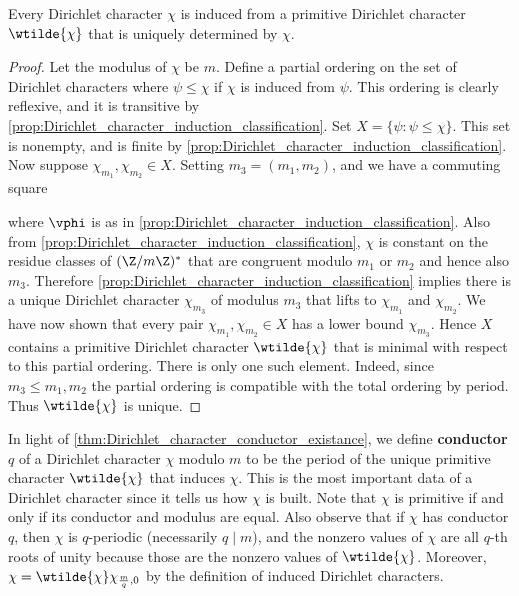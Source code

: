       \begin{theorem}\label{thm:Dirichlet_character_conductor_existance}
        Every Dirichlet character $\chi$ is induced from a primitive Dirichlet character $\wtilde{\chi}$ that is uniquely determined by $\chi$.
      \end{theorem}
      \begin{proof}
        Let the modulus of $\chi$ be $m$. Define a partial ordering on the set of Dirichlet characters where $\psi \le \chi$ if $\chi$ is induced from $\psi$. This ordering is clearly reflexive, and it is transitive by \cref{prop:Dirichlet_character_induction_classification}. Set $X = \{\psi:\psi \le \chi\}$. This set is nonempty, and is finite by \cref{prop:Dirichlet_character_induction_classification}. Now suppose $\chi_{m_{1}},\chi_{m_{2}} \in X$. Setting $m_{3} = (m_{1},m_{2})$, and we have a commuting square
        \begin{center}
        \end{center}
        where $\vphi$ is as in \cref{prop:Dirichlet_character_induction_classification}. Also from \cref{prop:Dirichlet_character_induction_classification}, $\chi$ is constant on the residue classes of $(\Z/m\Z)^{\ast}$ that are congruent modulo $m_{1}$ or $m_{2}$ and hence also $m_{3}$. Therefore \cref{prop:Dirichlet_character_induction_classification} implies there is a unique Dirichlet character $\chi_{m_{3}}$ of modulus $m_{3}$ that lifts to $\chi_{m_{1}}$ and $\chi_{m_{2}}$. We have now shown that every pair $\chi_{m_{1}},\chi_{m_{2}} \in X$ has a lower bound $\chi_{m_{3}}$. Hence $X$ contains a primitive Dirichlet character $\wtilde{\chi}$ that is minimal with respect to this partial ordering. There is only one such element. Indeed, since $m_{3} \le m_{1},m_{2}$ the partial ordering is compatible with the total ordering by period. Thus $\wtilde{\chi}$ is unique.
      \end{proof}

      In light of \cref{thm:Dirichlet_character_conductor_existance}, we define \textbf{conductor} $q$ of a Dirichlet character $\chi$ modulo $m$ to be the period of the unique primitive character $\wtilde{\chi}$ that induces $\chi$. This is the most important data of a Dirichlet character since it tells us how $\chi$ is built. Note that $\chi$ is primitive if and only if its conductor and modulus are equal. Also observe that if $\chi$ has conductor $q$, then $\chi$ is $q$-periodic (necessarily $q \mid m$), and the nonzero values of $\chi$ are all $q$-th roots of unity because those are the nonzero values of $\wtilde{\chi}$. Moreover, $\chi = \wtilde{\chi}\chi_{\frac{m}{q},0}$ by the definition of induced Dirichlet characters.

